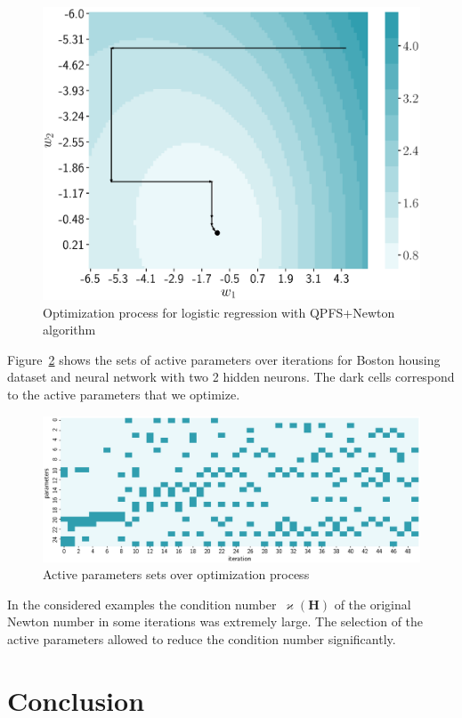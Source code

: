 \documentclass[a4paper,12pt]{article}
\renewcommand{\kappa}{\ensuremath{\varkappa}}
\theoremstyle{plain} %
\theoremstyle{definition} %
\theoremstyle{remark} %
\newcommand{\bH}{\mathbf{H}}
\begin{document}
	\begin{figure}
		\centering
		\includegraphics[width=0.6\linewidth]{figs/irls_qpfs_2d.eps}	 
		\caption{Optimization process for logistic regression with QPFS+Newton algorithm}
		\label{fig:irls_qpfs_2d}
	\end{figure}

	Figure~\ref{fig:active_params_wrt_iters} shows the sets of active parameters over iterations for Boston housing dataset and neural network with two 2 hidden neurons. The dark cells correspond to the active parameters that we optimize.

	\begin{figure}[!h]	
		\centering
		\includegraphics[width=\linewidth]{figs/active_params_wrt_iters.eps}	 
		\caption{Active parameters sets over optimization process}
		\label{fig:active_params_wrt_iters}
	\end{figure}
	
	In the considered examples the condition number~$\kappa (\bH)$ of the original Newton number in some iterations was extremely large. 
	The selection of the active parameters allowed to reduce the condition number significantly. 
	

	\section*{Conclusion}

  
  
  
	
\end{document}
